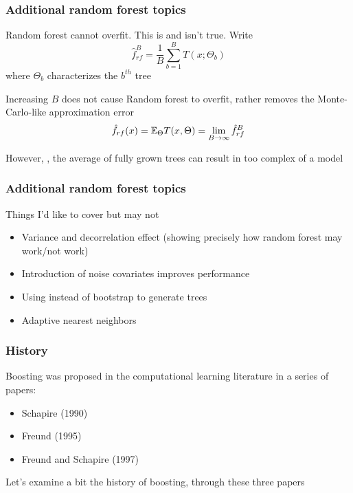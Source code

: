 \documentclass[12pt]{beamer}
\begin{document}
\begin{frame}
\frametitle{Additional random forest topics}
 Random forest cannot overfit.
\vsp
This is and isn't true.  Write
\[
\hat{f}_{rf}^B = \frac{1}{B} \sum_{b=1}^B T(x;\Theta_b)
\]
where $\Theta_b$ characterizes the $b^{th}$ tree

\vsp

Increasing $B$ does not cause Random forest to overfit, rather removes the
Monte-Carlo-like approximation error
\[
\hat{f}_{rf}(x) = \mathbb{E}_\Theta T(x,\Theta) = \lim_{B\rightarrow\infty}\hat{f}_{rf}^B
\]

\vsp

However, , the average of fully grown trees can result
in too complex of a model

\end{frame}


\begin{frame}
\frametitle{Additional random forest topics}
Things I'd like to cover but may not 


\begin{itemize}
\item Variance and decorrelation effect (showing precisely how random forest may work/not work)
\item Introduction of noise covariates improves performance
\item Using  instead of bootstrap to generate trees

\item Adaptive nearest neighbors
\end{itemize}
\end{frame}

\begin{frame}[fragile]
\frametitle{History}
Boosting was proposed in the computational learning literature in a series of papers:
\begin{itemize}
\item Schapire (1990)
\item Freund (1995)
\item Freund and Schapire (1997)
\end{itemize}

Let's examine a bit the history of boosting, through these three papers
\end{frame}
\end{document}
